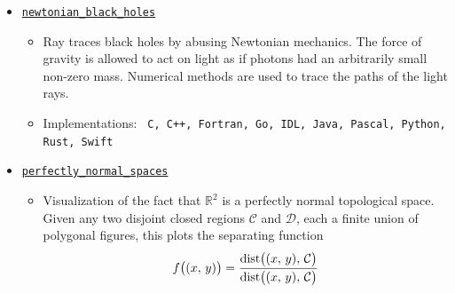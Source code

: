\documentclass[letterpaper,sans]{moderncv}
\begin{document}
\begin{itemize}
\begin{itemize}
                    \item
                        Renders Newton fractals for arbitrary polynomials
                        $p\in\mathbb{C}[z]$. Contains a full implementation of
                        the Hubbard--Schleicher--Sutherland algorithm for
                        finding all of the roots of a complex polynomial.
                    \item
                        Implementations: \texttt{C, Python}
                \end{itemize}
            \item
                \href{%
                    https://github.com/ryanmaguire/newtonian_black_holes/%
                }{\texttt{newtonian\_black\_holes}}
                \begin{itemize}
                    \item
                        Ray traces black holes by abusing Newtonian mechanics.
                        The force of gravity is allowed to act on light as if
                        photons had an arbitrarily small non-zero mass.
                        Numerical methods are used to trace the paths of the
                        light rays.
                    \item
                        Implementations:
                        \texttt{%
                            C, C++, Fortran, Go, IDL, Java,
                            Pascal, Python, Rust, Swift%
                        }
                \end{itemize}
            \item
                \href{%
                    https://github.com/ryanmaguire/perfectly_normal_spaces/%
                }{\texttt{perfectly\_normal\_spaces}}
                \begin{itemize}
                    \item
                        Visualization of the fact that $\mathbb{R}^{2}$ is a
                        perfectly normal topological space. Given any two
                        disjoint closed regions $\mathcal{C}$ and
                        $\mathcal{D}$, each a finite union of polygonal
                        figures, this plots the separating function
                        \[
                            f\big((x,\,y)\big)
                            =
                            \frac{%
                                \textrm{dist}\big((x,\,y),\,\mathcal{C}\big)%
                            }{%
                                \textrm{dist}\big((x,\,y),\,\mathcal{C}\big)%
}\]
\end{itemize}
\end{itemize}
\end{document}
